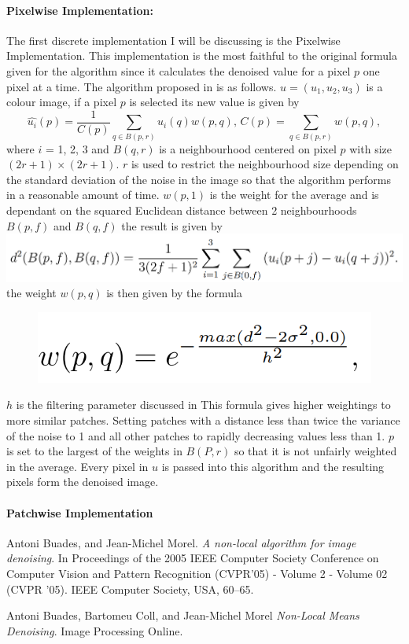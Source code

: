 \documentclass[11pt,letterpaper]{article}
\begin{document}
\paragraph{Pixelwise Implementation:}
The first discrete implementation I will be discussing is the Pixelwise Implementation. This implementation is the most faithful to the original formula given for the algorithm since it calculates the denoised value for a pixel $p$ one pixel at a time. The algorithm proposed in \cite{paper2} is as follows.
$u = (u_{1}, u_{2}, u_{3})$ is a colour image, if a pixel $p$ is selected its new value is given by
$$\mathit{\hat{u_{i}}(p) = \frac{1}{C(p)} \sum_{q\in B(p,r)}^{}u_{i}(q)w(p,q)}\text{,    }\mathit{C(p)=\sum_{q\in B(p,r)}^{}w(p,q)},$$
where $i$ = 1, 2, 3 and $B(q,r)$ is a neighbourhood centered on pixel $p$ with size $\mathit{(2r+1)\times (2r+1)}$. $r$ is used to restrict the neighbourhood size depending on the standard deviation of the noise in the image so that the algorithm performs in a reasonable amount of time. $w(p,1)$ is the weight for the average and is dependant on the squared Euclidean distance between 2 neighbourhoods $B(p,f)$ and $B(q,f)$ the result is given by 
\includegraphics{weighted}
the weight $w(p,q)$ is then given by the formula
\begin{figure}
\centering
\includegraphics{w}
\end{figure}
$h$ is the filtering parameter discussed in \cite{paper1} This formula gives higher weightings to more similar patches. Setting patches with a distance less than twice the variance of the noise to 1 and all other patches to rapidly decreasing values less than 1. $p$ is set to the largest of the weights in $B(P,r)$ so that it is not unfairly weighted in the average. Every pixel in $u$ is passed into this algorithm and the resulting pixels form the denoised image.
\paragraph{Patchwise Implementation}

\begin{thebibliography}{9}
Antoni Buades, and Jean-Michel Morel.
\textit{A non-local algorithm for image denoising}.
In Proceedings of the 2005 IEEE Computer Society Conference on Computer Vision and Pattern Recognition (CVPR’05) - Volume 2 - Volume 02 (CVPR ’05). IEEE Computer Society, USA, 60–65.

Antoni Buades, Bartomeu Coll, and Jean-Michel Morel
\textit{Non-Local Means Denoising}.
Image Processing Online.


\end{thebibliography}
\end{document}
